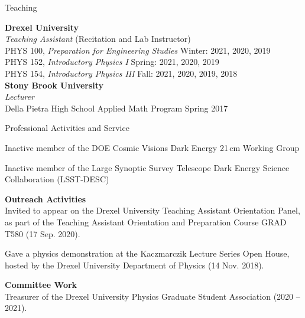 \documentclass{resume} %
\newcommand{\forceindent}{\leavevmode{\parindent=1em\indent}}
\begin{document}
\begin{rSection}{Teaching}

\textbf{Drexel University} \\ 
\textit{Teaching Assistant} (Recitation and Lab Instructor)\\
\forceindent PHYS 100, \textit{Preparation for Engineering Studies}  \hfill {Winter: 2021, 2020, 2019}\\
\forceindent PHYS 152, \textit{Introductory Physics I}  \hfill {Spring: 2021, 2020, 2019}\\
\forceindent PHYS 154, \textit{Introductory Physics III}  \hfill {Fall: 2021, 2020, 2019, 2018}\\
\textbf{Stony Brook University} \\
\textit{Lecturer}\\
\forceindent  Della Pietra High School Applied Math Program \hfill {Spring 2017}

\end{rSection}


\begin{rSection}{Professional Activities and Service}

\begin{description}[leftmargin=10em, style=nextline]

\item[Working Groups] Inactive member of the DOE Cosmic Visions Dark Energy 21$\,$cm Working 
 Group

\item[Collaborations] Inactive member of the Large Synoptic Survey Telescope Dark Energy 
 Science Collaboration (LSST-DESC)

\end{description}

\textbf{Outreach Activities}\\
Invited to appear on the Drexel University Teaching Assistant Orientation Panel, as part of the Teaching Assistant Orientation and Preparation Course GRAD T580 (17 Sep. 2020).

Gave a physics demonstration at the Kaczmarczik Lecture Series Open House, hosted by the Drexel University Department of Physics (14 Nov. 2018).

\textbf{Committee Work}\\
Treasurer of the Drexel University Physics Graduate Student Association (2020 -- 2021).

\end{rSection}
\end{document}
